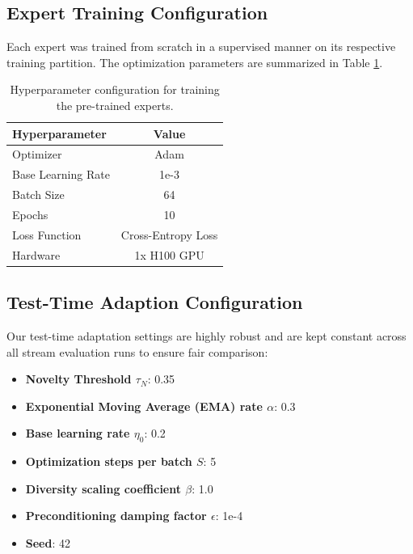\documentclass{article}
\theoremstyle{plain}
\theoremstyle{definition}
\theoremstyle{remark}
\begin{document}
\subsection{Expert Training Configuration}
Each expert was trained from scratch in a supervised manner on its respective training partition. The optimization parameters are summarized in Table \ref{tab:expert_hyperparams}.

\begin{table}[h]
\caption{Hyperparameter configuration for training the pre-trained experts.}
\label{tab:expert_hyperparams}
\vskip 0.1in
\begin{center}
\begin{small}
\begin{tabular}{lc}
\toprule
Hyperparameter & Value \\
\midrule
Optimizer & Adam \\
Base Learning Rate & 1e-3 \\
Batch Size & 64 \\
Epochs & 10 \\
Loss Function & Cross-Entropy Loss \\
Hardware & 1x H100 GPU \\
\bottomrule
\end{tabular}
\end{small}
\end{center}
\vskip -0.1in
\end{table}

\subsection{Test-Time Adaption Configuration}
Our test-time adaptation settings are highly robust and are kept constant across all stream evaluation runs to ensure fair comparison:
\begin{itemize}
    \item \textbf{Novelty Threshold $\tau_N$}: 0.35
    \item \textbf{Exponential Moving Average (EMA) rate $\alpha$}: 0.3
    \item \textbf{Base learning rate $\eta_0$}: 0.2
    \item \textbf{Optimization steps per batch $S$}: 5
    \item \textbf{Diversity scaling coefficient $\beta$}: 1.0
    \item \textbf{Preconditioning damping factor $\epsilon$}: 1e-4
    \item \textbf{Seed}: 42
\end{itemize}
\end{document}
